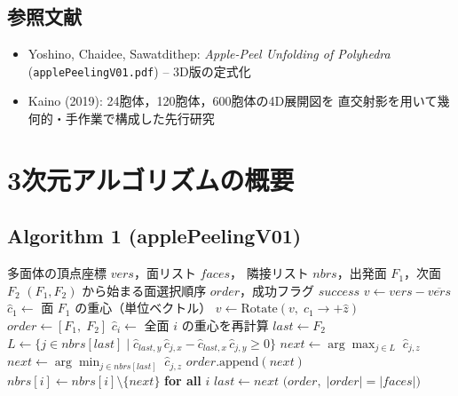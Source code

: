 \documentclass[12pt,a4paper]{article}
\theoremstyle{definition}
\begin{document}
\subsection{参照文献}

\begin{itemize}
  \item Yoshino, Chaidee, Sawatdithep: \textit{Apple-Peel Unfolding of Polyhedra}
        (\texttt{applePeelingV01.pdf}) -- 3D版の定式化
  \item Kaino (2019): 24胞体，120胞体，600胞体の4D展開図を
        直交射影を用いて幾何的・手作業で構成した先行研究
\end{itemize}


\section{3次元アルゴリズムの概要}

\subsection{Algorithm 1 (applePeelingV01)}

\begin{algorithm}[h]
\caption{Apple-Peel Unfolding（3次元版）}
\label{alg:3d}
\begin{algorithmic}[1]
\Require 多面体の頂点座標 $\mathit{vers}$，面リスト $\mathit{faces}$，
         隣接リスト $\mathit{nbrs}$，出発面 $F_1$，次面 $F_2$
\Ensure  $(F_1, F_2)$ から始まる面選択順序 $\mathit{order}$，成功フラグ $\mathit{success}$
\State $v \gets \mathit{vers} - \overline{\mathit{vers}}$
\State $\hat{c}_1 \gets$ 面 $F_1$ の重心（単位ベクトル）
\State $v \gets \mathrm{Rotate}(v,\; \hat{c}_1 \to +\hat{z})$
\State $\mathit{order} \gets [F_1,\; F_2]$
\State $\hat{c}_i \gets$ 全面 $i$ の重心を再計算
\State $\mathit{last} \gets F_2$
  \State $L \gets \bigl\{j \in \mathit{nbrs}[\mathit{last}] \mid
           \hat{c}_{\mathit{last},y}\,\hat{c}_{j,x}
           - \hat{c}_{\mathit{last},x}\,\hat{c}_{j,y} \geq 0\bigr\}$
    \State $\mathit{next} \gets \arg\max_{j \in L}\; \hat{c}_{j,z}$
  \Else
    \State $\mathit{next} \gets \arg\min_{j \in \mathit{nbrs}[\mathit{last}]}\; \hat{c}_{j,z}$
  \EndIf
  \State $\mathit{order}.\mathrm{append}(\mathit{next})$
  \State $\mathit{nbrs}[i] \gets \mathit{nbrs}[i] \setminus \{\mathit{next}\}$ \textbf{for all} $i$
  \State $\mathit{last} \gets \mathit{next}$
\EndWhile
\State \Return $\bigl(\mathit{order},\; |\mathit{order}| = |\mathit{faces}|\bigr)$
\end{algorithmic}
\end{algorithm}
\end{document}
